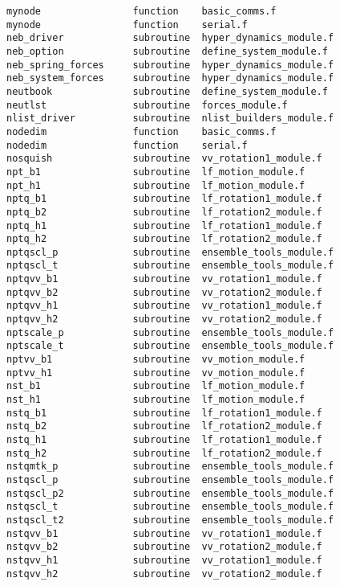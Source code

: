 \begin{verbatim}
mynode                function    basic_comms.f             
mynode                function    serial.f                  
neb_driver            subroutine  hyper_dynamics_module.f   
neb_option            subroutine  define_system_module.f    
neb_spring_forces     subroutine  hyper_dynamics_module.f   
neb_system_forces     subroutine  hyper_dynamics_module.f   
neutbook              subroutine  define_system_module.f    
neutlst               subroutine  forces_module.f           
nlist_driver          subroutine  nlist_builders_module.f   
nodedim               function    basic_comms.f             
nodedim               function    serial.f                  
nosquish              subroutine  vv_rotation1_module.f     
npt_b1                subroutine  lf_motion_module.f        
npt_h1                subroutine  lf_motion_module.f        
nptq_b1               subroutine  lf_rotation1_module.f     
nptq_b2               subroutine  lf_rotation2_module.f     
nptq_h1               subroutine  lf_rotation1_module.f     
nptq_h2               subroutine  lf_rotation2_module.f     
nptqscl_p             subroutine  ensemble_tools_module.f   
nptqscl_t             subroutine  ensemble_tools_module.f   
nptqvv_b1             subroutine  vv_rotation1_module.f     
nptqvv_b2             subroutine  vv_rotation2_module.f     
nptqvv_h1             subroutine  vv_rotation1_module.f     
nptqvv_h2             subroutine  vv_rotation2_module.f     
nptscale_p            subroutine  ensemble_tools_module.f   
nptscale_t            subroutine  ensemble_tools_module.f   
nptvv_b1              subroutine  vv_motion_module.f        
nptvv_h1              subroutine  vv_motion_module.f        
nst_b1                subroutine  lf_motion_module.f        
nst_h1                subroutine  lf_motion_module.f        
nstq_b1               subroutine  lf_rotation1_module.f     
nstq_b2               subroutine  lf_rotation2_module.f     
nstq_h1               subroutine  lf_rotation1_module.f     
nstq_h2               subroutine  lf_rotation2_module.f     
nstqmtk_p             subroutine  ensemble_tools_module.f   
nstqscl_p             subroutine  ensemble_tools_module.f   
nstqscl_p2            subroutine  ensemble_tools_module.f   
nstqscl_t             subroutine  ensemble_tools_module.f   
nstqscl_t2            subroutine  ensemble_tools_module.f   
nstqvv_b1             subroutine  vv_rotation1_module.f     
nstqvv_b2             subroutine  vv_rotation2_module.f     
nstqvv_h1             subroutine  vv_rotation1_module.f     
nstqvv_h2             subroutine  vv_rotation2_module.f     

\end{verbatim}
